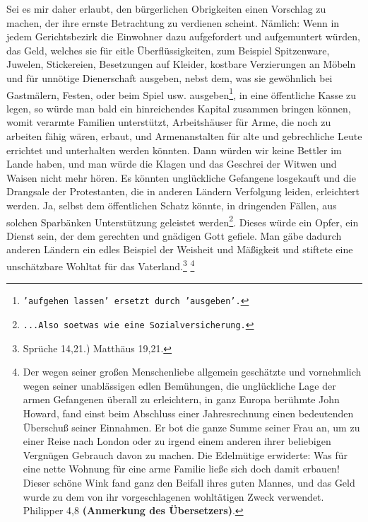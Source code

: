 Sei es mir daher erlaubt, den bürgerlichen
Obrigkeiten einen Vorschlag zu machen,
der ihre ernste Betrachtung zu verdienen scheint. Nämlich: Wenn in jedem
Gerichtsbezirk die Einwohner dazu aufgefordert und aufgemuntert würden, das
Geld, welches sie für eitle Überflüssigkeiten, zum Beispiel Spitzenware, Juwelen,
Stickereien, Besetzungen auf Kleider, kostbare Verzierungen an Möbeln und für
unnötige Dienerschaft ausgeben, nebst dem, was sie gewöhnlich bei Gastmälern,
Festen, oder beim Spiel usw. ausgeben\footnote{\texttt{'aufgehen lassen'
ersetzt durch 'ausgeben'.}}, in eine öffentliche Kasse zu
legen, so würde man bald ein hinreichendes Kapital zusammen bringen können,
womit verarmte Familien unterstützt, Arbeitshäuser für Arme, die noch zu
arbeiten fähig wären, erbaut, und Armenanstalten für alte und
gebrechliche
Leute errichtet und unterhalten werden könnten. Dann
würden wir keine Bettler im Lande haben, und man würde
die Klagen
und das
Geschrei der Witwen und Waisen nicht mehr hören. Es könnten unglückliche
Gefangene losgekauft und die Drangsale der Protestanten, die in anderen Ländern
Verfolgung leiden, erleichtert werden. Ja,
selbst dem öffentlichen Schatz könnte, in dringenden
Fällen, aus solchen
Sparbänken Unterstützung geleistet werden\footnote{\texttt{...Also soetwas wie
eine Sozialversicherung.}}. Dieses würde ein Opfer, ein Dienst
sein, der dem gerechten und gnädigen Gott gefiele. Man gäbe dadurch anderen
Ländern ein edles Beispiel der Weisheit und Mäßigkeit und stiftete eine
unschätzbare Wohltat für das Vaterland.\footnote{Sprüche 14,21.)
Matthäus 19,21.}
\footnote{Der wegen seiner großen
Menschenliebe allgemein geschätzte und vornehmlich wegen seiner unablässigen
edlen Bemühungen, die unglückliche Lage der armen Gefangenen überall zu
erleichtern, in ganz Europa berühmte John Howard,
fand einst beim Abschluss
einer Jahresrechnung einen bedeutenden
Überschuß seiner Einnahmen. Er bot die
ganze Summe seiner Frau an, um zu einer Reise nach London
oder zu irgend
einem anderen ihrer beliebigen Vergnügen Gebrauch davon zu machen. Die
Edelmütige
erwiderte: Was für eine nette Wohnung für eine arme Familie ließe sich doch
damit erbauen! Dieser schöne Wink fand ganz den Beifall
ihres guten Mannes, und das Geld wurde zu dem von ihr vorgeschlagenen
wohltätigen Zweck verwendet. Philipper 4,8
\textbf{(Anmerkung des Übersetzers)}.}


